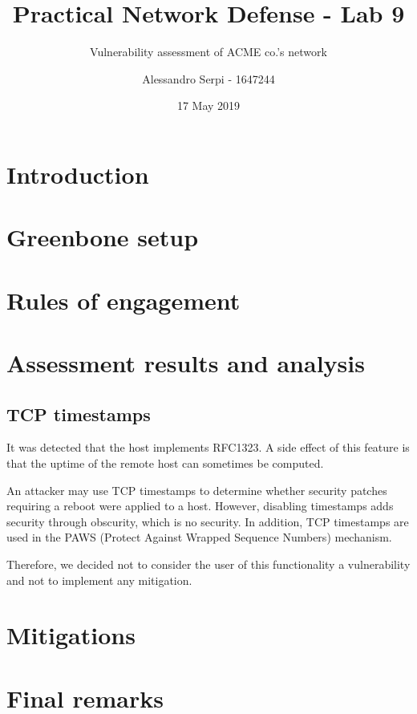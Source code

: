 \documentclass[draft]{homework}
\title{Practical Network Defense - Lab 9}
\subtitle{Vulnerability assessment of ACME co.'s network}
\author{Alessandro Serpi - 1647244}
\date{17 May 2019}
\begin{document}
    \maketitle
    \tableofcontents
    
    
    \pagebreak
    \section{Introduction}
    
    
    \section{Greenbone setup}
    
    
    \section{Rules of engagement}
    
    
    \section{Assessment results and analysis}
    \subsection{TCP timestamps}
    \begin{displayquote}
        It was detected that the host implements RFC1323.
        \textelp{}
        A side effect of this feature is that the uptime of the remote host can sometimes be computed.
    \end{displayquote}
    
    An attacker may use TCP timestamps to determine whether security patches requiring a reboot were applied to a host.
    However, disabling timestamps adds security through obscurity, which is no security. 
    In addition, TCP timestamps are used in the PAWS (Protect Against Wrapped Sequence Numbers) mechanism.
    
    Therefore, we decided not to consider the user of this functionality a vulnerability and not to implement any mitigation.
    
    
    
    \section{Mitigations}
    
    
    \section{Final remarks}
\end{document}
